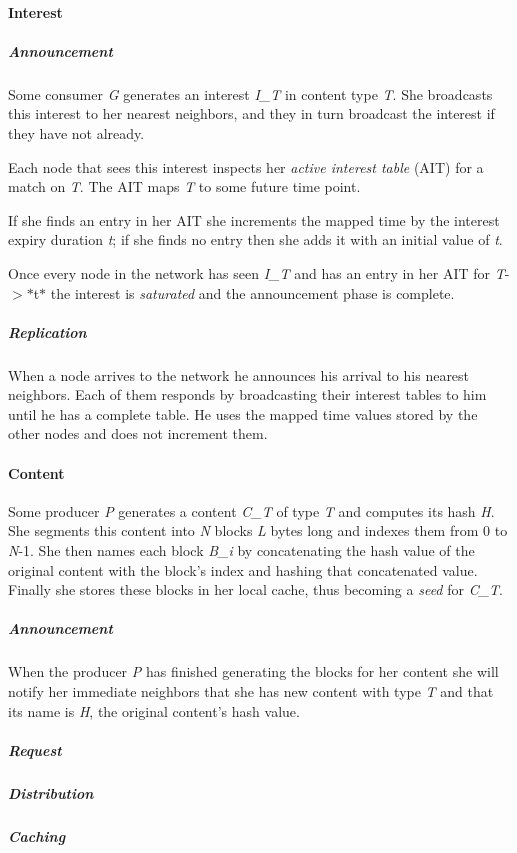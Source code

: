 \paragraph*{Interest}

\subparagraph*{Announcement}

Some consumer {\itshape G} generates an interest {\itshape I\-\_\-\-T} in content type {\itshape T}. She broadcasts this interest to her nearest neighbors, and they in turn broadcast the interest if they have not already.

Each node that sees this interest inspects her {\itshape active interest table} (A\-I\-T) for a match on {\itshape T}. The A\-I\-T maps {\itshape T} to some future time point.

If she finds an entry in her A\-I\-T she increments the mapped time by the interest expiry duration {\itshape t}; if she finds no entry then she adds it with an initial value of {\itshape t}.

Once every node in the network has seen {\itshape I\-\_\-\-T} and has an entry in her A\-I\-T for {\itshape T}{\ttfamily -\/$>$}$\ast$t$\ast$ the interest is {\itshape saturated} and the announcement phase is complete.

\subparagraph*{Replication}

When a node arrives to the network he announces his arrival to his nearest neighbors. Each of them responds by broadcasting their interest tables to him until he has a complete table. He uses the mapped time values stored by the other nodes and does not increment them.

\paragraph*{Content}

Some producer {\itshape P} generates a content {\itshape C\-\_\-\-T} of type {\itshape T} and computes its hash {\itshape H}. She segments this content into {\itshape N} blocks {\itshape L} bytes long and indexes them from 0 to {\itshape N}-\/1. She then names each block {\itshape B\-\_\-i} by concatenating the hash value of the original content with the block's index and hashing that concatenated value. Finally she stores these blocks in her local cache, thus becoming a {\itshape seed} for {\itshape C\-\_\-\-T}.

\subparagraph*{Announcement}

When the producer {\itshape P} has finished generating the blocks for her content she will notify her immediate neighbors that she has new content with type {\itshape T} and that its name is {\itshape H}, the original content's hash value.

\subparagraph*{Request}

\subparagraph*{Distribution}

\subparagraph*{Caching}
